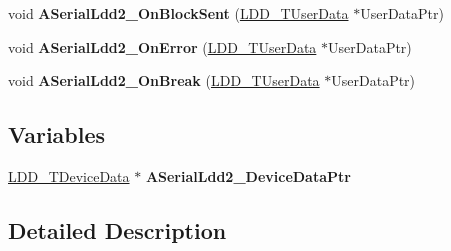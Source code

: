 \begin{DoxyCompactItemize}
\item 
void {\bfseries A\+Serial\+Ldd2\+\_\+\+On\+Block\+Sent} (\hyperlink{group___p_e___types__module_ga0b66a73f87238a782318aa0be7578e35}{L\+D\+D\+\_\+\+T\+User\+Data} $\ast$User\+Data\+Ptr)\hypertarget{group___a_s2__module_ga723758484ee852a66a707036a9a38a92}{}\label{group___a_s2__module_ga723758484ee852a66a707036a9a38a92}

\item 
void {\bfseries A\+Serial\+Ldd2\+\_\+\+On\+Error} (\hyperlink{group___p_e___types__module_ga0b66a73f87238a782318aa0be7578e35}{L\+D\+D\+\_\+\+T\+User\+Data} $\ast$User\+Data\+Ptr)\hypertarget{group___a_s2__module_ga145a063bdf852caee1c1b8adeb02fc77}{}\label{group___a_s2__module_ga145a063bdf852caee1c1b8adeb02fc77}

\item 
void {\bfseries A\+Serial\+Ldd2\+\_\+\+On\+Break} (\hyperlink{group___p_e___types__module_ga0b66a73f87238a782318aa0be7578e35}{L\+D\+D\+\_\+\+T\+User\+Data} $\ast$User\+Data\+Ptr)\hypertarget{group___a_s2__module_ga702765a2c9f1c0e914a6ca8484088ec5}{}\label{group___a_s2__module_ga702765a2c9f1c0e914a6ca8484088ec5}

\end{DoxyCompactItemize}
\subsection*{Variables}
\begin{DoxyCompactItemize}
\item 
\hyperlink{group___p_e___types__module_gac5cf1362f1f0e3a2ce71b1bf2276d091}{L\+D\+D\+\_\+\+T\+Device\+Data} $\ast$ {\bfseries A\+Serial\+Ldd2\+\_\+\+Device\+Data\+Ptr}\hypertarget{group___a_s2__module_gadee68051b76891befdaf56e3da755391}{}\label{group___a_s2__module_gadee68051b76891befdaf56e3da755391}

\end{DoxyCompactItemize}


\subsection{Detailed Description}
